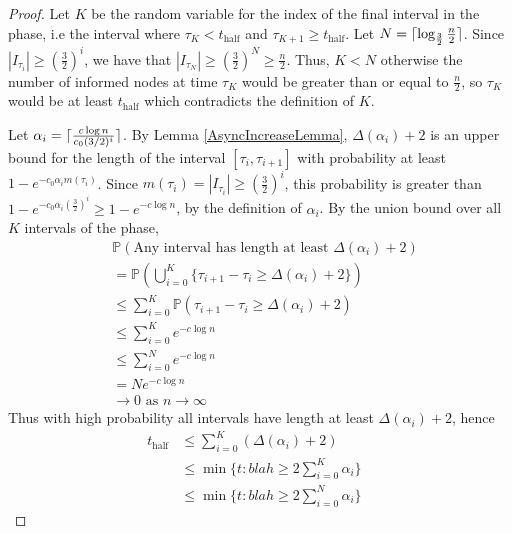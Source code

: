 \begin{proof}
	Let $K$ be the random variable for the index of the final interval in the phase, i.e the interval where $\tau_K < t_\text{half}$ and $\tau_{K+1} \geq t_\text{half}$.
	Let $N = \lceil\log_\frac{3}{2}\frac{n}{2}\rceil$.  Since $|I_{\tau_i}| \geq (\frac{3}{2})^i$, we have that $|I_{\tau_N}| \geq (\frac{3}{2})^N \geq \frac{n}{2}$. Thus, $K < N$ otherwise the number of informed nodes at time $\tau_K$ would be greater than or equal to $\frac{n}{2}$, so $\tau_K$ would be at least $t_\text{half}$ which contradicts the definition of $K$.

	Let $\alpha_i = \lceil\frac{c \log n}{c_0 (3/2)^i}\rceil$. %
	By Lemma \ref{AsyncIncreaseLemma}, $\Delta(\alpha_i) + 2$ is an upper bound for the length of the interval $[\tau_i, \tau_{i+1}]$ 
	with probability at least $1 - e^{-c_0\alpha_i m(\tau_i)}$. %
	Since $m(\tau_i) = |I_{\tau_i}| \geq (\frac{3}{2})^i$, this probability is greater than $1 - e^{-c_0\alpha_i (\frac{3}{2})^i} \geq 1 - e^{-c \log n}$, by the definition of $\alpha_i$. By the union bound over all $K$ intervals of the phase,
	\begin{align*}
		& \mathbb{P}(\text{Any interval has length at least } \Delta(\alpha_i) + 2) \\
		&= \mathbb{P}(\bigcup_{i=0}^K \{\tau_{i+1} - \tau_i \geq \Delta(\alpha_i) + 2\}) \\
		&\leq \sum_{i=0}^K \mathbb{P}(\tau_{i+1} - \tau_i \geq \Delta(\alpha_i) + 2) \\
		&\leq \sum_{i=0}^K e^{-c \log n} \\
		&\leq \sum_{i=0}^N e^{-c \log n} 
		\\
		&= N e^{-c \log n} \\
		&\to 0 \text { as } n \to \infty
	\end{align*}
	Thus with high probability all intervals have length at least $\Delta(\alpha_i) + 2$, hence
	\begin{align*}
		t_\text{half} &\leq \sum_{i=0}^K (\Delta(\alpha_i) + 2) \\
		&\leq \min \{t : blah \geq 2 \sum_{i=0}^K \alpha_i \} \\ %
		&\leq \min \{t : blah \geq 2 \sum_{i=0}^N \alpha_i \} & %
	\end{align*}



\end{proof}
